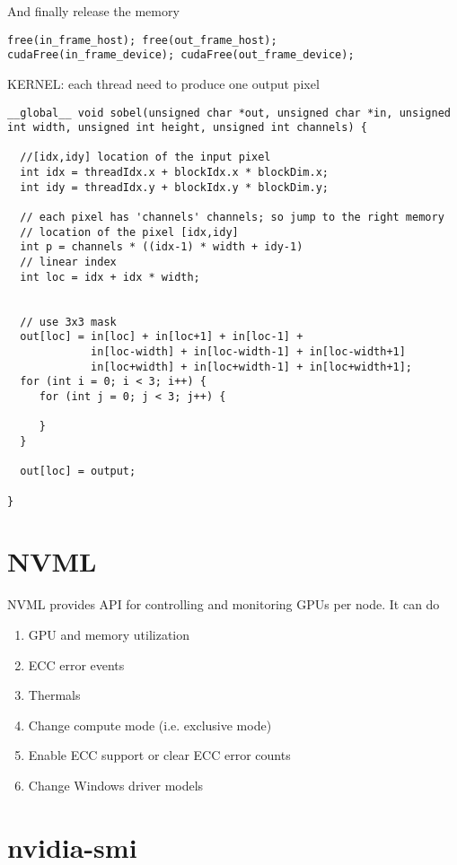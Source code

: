 And finally release the memory
\begin{lstlisting}
free(in_frame_host); free(out_frame_host);
cudaFree(in_frame_device); cudaFree(out_frame_device);
\end{lstlisting}

KERNEL: each thread need to produce one output pixel
\begin{lstlisting}
__global__ void sobel(unsigned char *out, unsigned char *in, unsigned
int width, unsigned int height, unsigned int channels) {

  //[idx,idy] location of the input pixel
  int idx = threadIdx.x + blockIdx.x * blockDim.x;
  int idy = threadIdx.y + blockIdx.y * blockDim.y;

  // each pixel has 'channels' channels; so jump to the right memory 
  // location of the pixel [idx,idy]
  int p = channels * ((idx-1) * width + idy-1)
  // linear index
  int loc = idx + idx * width;


  // use 3x3 mask
  out[loc] = in[loc] + in[loc+1] + in[loc-1] + 
             in[loc-width] + in[loc-width-1] + in[loc-width+1]
             in[loc+width] + in[loc+width-1] + in[loc+width+1];
  for (int i = 0; i < 3; i++) {
     for (int j = 0; j < 3; j++) {
         
     }
  }

  out[loc] = output;

}
\end{lstlisting}


\section{NVML}
\label{sec:tool_NVML}

NVML provides API for controlling and monitoring GPUs per node. It can do
\begin{enumerate}
  \item GPU and memory utilization
\item ECC error events
\item Thermals
\item Change compute mode (i.e. exclusive mode)
\item Enable ECC support or clear ECC error counts
\item Change Windows driver models 
\end{enumerate}

\section{nvidia-smi}
\label{sec:tool_nvidiasmi}

